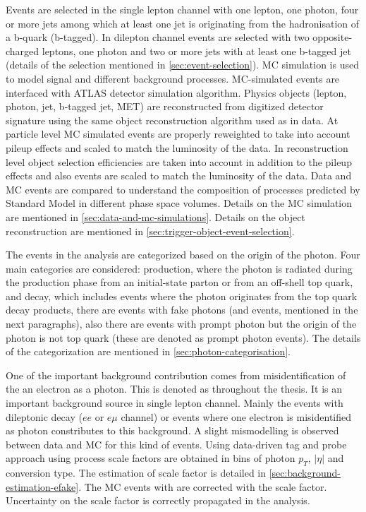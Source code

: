 Events are selected in the single lepton channel with one lepton, one photon, four or more jets among which at least one jet is originating from the hadronisation of a b-quark (b-tagged). In dilepton channel events are selected with two opposite-charged leptons, one photon and two or more jets with at least one b-tagged jet (details of the selection mentioned in \cref{sec:event-selection}). MC simulation is used to model signal and different background processes. MC-simulated events are interfaced with ATLAS detector simulation algorithm. Physics objects (lepton, photon, jet, b-tagged jet, MET) are reconstructed from digitized detector signature using the same object reconstruction algorithm used as in data. At particle level MC simulated events are properly reweighted to take into account pileup effects and scaled to match the luminosity of the data. In reconstruction level object selection efficiencies are taken into account in addition to the pileup effects and also events are scaled to match the luminosity of the data. Data and MC events are compared to understand the composition of processes predicted by Standard Model in different phase space volumes. Details on the MC simulation are mentioned in \cref{sec:data-and-mc-simulations}. Details on the object reconstruction are mentioned in \cref{sec:trigger-object-event-selection}.


The events in the analysis are categorized based on the origin of the photon. Four main categories are considered: \tty production, where the photon is radiated during the production phase from an initial-state parton or from an off-shell top quark, and \tty decay, which includes events where the photon originates from the top quark decay products, there are events with fake photons (\efake and \hfake events, mentioned in the next paragraphs), also there are events with prompt photon but the origin of the photon is not top quark (these are denoted as prompt photon events). The details of the categorization are mentioned in \cref{sec:photon-categorisation}.

One of the important background contribution comes from misidentification of the an electron as a photon. This is denoted as \efake throughout the thesis. It is an important background source in single lepton channel. Mainly the \ttbar events with dileptonic decay ($ee$ or $e\mu$ channel) or \zee events where one electron is misidentified as photon constributes to this background. A slight mismodelling is observed between data and MC for this kind of events. Using data-driven tag and probe approach using \zee process scale factors are obtained in bins of photon $p_T$, $|\eta|$ and conversion type. The estimation of scale factor is detailed in \cref{sec:background-estimation-efake}. The MC events with \efake are corrected with the scale factor. Uncertainty on the scale factor is correctly propagated in the analysis.

